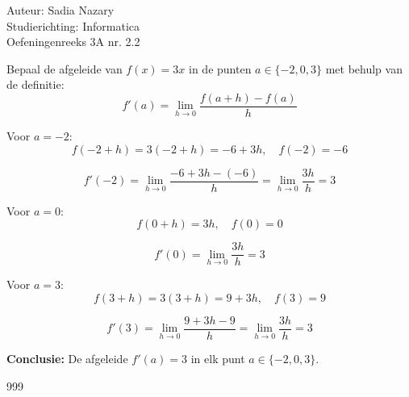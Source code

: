 \documentclass[a4paper]{article}
\begin{document}
\noindent \large Auteur: Sadia Nazary \\
\noindent \large Studierichting: Informatica \\
\noindent \large Oefeningenreeks 3A nr. 2.2 \\

\medskip

\normalsize

\noindent Bepaal de afgeleide van $f(x) = 3x$ in de punten $a \in \{-2, 0, 3\}$ met behulp van de definitie: \\

$$
f'(a) = \lim\limits_{h \to 0} \dfrac{f(a + h) - f(a)}{h}
$$

\noindent Voor $a = -2$: \\

$$
f(-2 + h) = 3(-2 + h) = -6 + 3h, \quad f(-2) = -6
$$

$$
f'(-2) = \lim\limits_{h \to 0} \dfrac{-6 + 3h - (-6)}{h} = \lim\limits_{h \to 0} \dfrac{3h}{h} = 3
$$

\noindent Voor $a = 0$: \\

$$
f(0 + h) = 3h, \quad f(0) = 0
$$

$$
f'(0) = \lim\limits_{h \to 0} \dfrac{3h}{h} = 3
$$

\noindent Voor $a = 3$: \\

$$
f(3 + h) = 3(3 + h) = 9 + 3h, \quad f(3) = 9
$$

$$
f'(3) = \lim\limits_{h \to 0} \dfrac{9 + 3h - 9}{h} = \lim\limits_{h \to 0} \dfrac{3h}{h} = 3
$$

\textbf{Conclusie:} De afgeleide $f'(a) = 3$ in elk punt $a \in \{-2, 0, 3\}$. \\

\begin{thebibliography}{999}
\end{thebibliography}
\end{document}
